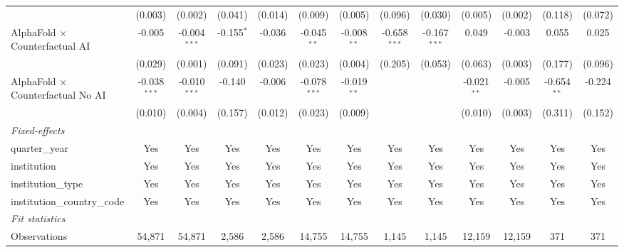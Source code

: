 \begin{tabular}{lcccccccccccc}
                                            & (0.003)        & (0.002)        & (0.041)      & (0.014) & (0.009)        & (0.005)       & (0.096)        & (0.030)        & (0.005)       & (0.002)     & (0.118)       & (0.072)\\   
   AlphaFold $\times$ Counterfactual AI     & -0.005         & -0.004$^{***}$ & -0.155$^{*}$ & -0.036  & -0.045$^{**}$  & -0.008$^{**}$ & -0.658$^{***}$ & -0.167$^{***}$ & 0.049         & -0.003      & 0.055         & 0.025\\   
                                            & (0.029)        & (0.001)        & (0.091)      & (0.023) & (0.023)        & (0.004)       & (0.205)        & (0.053)        & (0.063)       & (0.003)     & (0.177)       & (0.096)\\   
   AlphaFold $\times$ Counterfactual No AI  & -0.038$^{***}$ & -0.010$^{***}$ & -0.140       & -0.006  & -0.078$^{***}$ & -0.019$^{**}$ &                &                & -0.021$^{**}$ & -0.005      & -0.654$^{**}$ & -0.224\\   
                                            & (0.010)        & (0.004)        & (0.157)      & (0.012) & (0.023)        & (0.009)       &                &                & (0.010)       & (0.003)     & (0.311)       & (0.152)\\   
   \midrule
   \emph{Fixed-effects}\\
   quarter\_year                            & Yes            & Yes            & Yes          & Yes     & Yes            & Yes           & Yes            & Yes            & Yes           & Yes         & Yes           & Yes\\  
   institution                              & Yes            & Yes            & Yes          & Yes     & Yes            & Yes           & Yes            & Yes            & Yes           & Yes         & Yes           & Yes\\  
   institution\_type                        & Yes            & Yes            & Yes          & Yes     & Yes            & Yes           & Yes            & Yes            & Yes           & Yes         & Yes           & Yes\\  
   institution\_country\_code               & Yes            & Yes            & Yes          & Yes     & Yes            & Yes           & Yes            & Yes            & Yes           & Yes         & Yes           & Yes\\  
   \midrule
   \emph{Fit statistics}\\
   Observations                             & 54,871         & 54,871         & 2,586        & 2,586   & 14,755         & 14,755        & 1,145          & 1,145          & 12,159        & 12,159      & 371           & 371\\  

\end{tabular}
